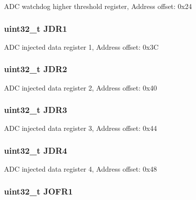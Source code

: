 A\-D\-C watchdog higher threshold register, Address offset\-: 0x24 \hypertarget{struct_a_d_c___type_def_a22fa21352be442bd02f9c26a1013d598}{
\subsubsection[{J\-D\-R1}]{ uint32\-\_\-t J\-D\-R1}}\label{struct_a_d_c___type_def_a22fa21352be442bd02f9c26a1013d598}
A\-D\-C injected data register 1, Address offset\-: 0x3\-C \hypertarget{struct_a_d_c___type_def_ae9156af81694b7a85923348be45a2167}{
\subsubsection[{J\-D\-R2}]{ uint32\-\_\-t J\-D\-R2}}\label{struct_a_d_c___type_def_ae9156af81694b7a85923348be45a2167}
A\-D\-C injected data register 2, Address offset\-: 0x40 \hypertarget{struct_a_d_c___type_def_a3a54028253a75a470fccf841178cba46}{
\subsubsection[{J\-D\-R3}]{ uint32\-\_\-t J\-D\-R3}}\label{struct_a_d_c___type_def_a3a54028253a75a470fccf841178cba46}
A\-D\-C injected data register 3, Address offset\-: 0x44 \hypertarget{struct_a_d_c___type_def_a9274ceea3b2c6d5c1903d0a7abad91a1}{
\subsubsection[{J\-D\-R4}]{ uint32\-\_\-t J\-D\-R4}}\label{struct_a_d_c___type_def_a9274ceea3b2c6d5c1903d0a7abad91a1}
A\-D\-C injected data register 4, Address offset\-: 0x48 \hypertarget{struct_a_d_c___type_def_a427dda1678f254bd98b1f321d7194a3b}{
\subsubsection[{J\-O\-F\-R1}]{ uint32\-\_\-t J\-O\-F\-R1}}\label{struct_a_d_c___type_def_a427dda1678f254bd98b1f321d7194a3b}
